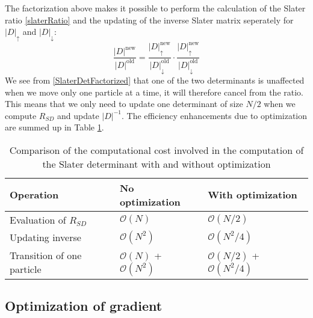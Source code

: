 \documentclass[english, a4paper]{article}
\begin{document}
\noindent The factorization above makes it possible to perform the calculation of the Slater ratio \eqref{slaterRatio}
and the updating of the inverse Slater matrix seperately for $|D|_\uparrow$ and $|D|_\downarrow$:
\begin{equation}
 \frac{|D|^{\textrm{new}}}{|D|^{\textrm{old}}} = \frac{|D|^{\textrm{new}}_\uparrow}{|D|^{\textrm{old}}_\downarrow}
 \cdot
 \frac{|D|^{\textrm{new}}_\uparrow}{|D|^{\textrm{old}}_\downarrow}
\end{equation}
We see from \eqref{SlaterDetFactorized} that one of the two determinants is unaffected
when we move only one particle at a time, it will therefore cancel from the ratio. This means
that we only need to update one determinant of size $N/2$ when we compute $R_{SD}$
and update $|D|^{-1}$. The efficiency enhancements due to optimization are summed up in Table \ref{tab:optimization}.
\begin{table}[H] 
  \begin{center}
    \begin{tabular*}{14cm}{@{\extracolsep{\fill}} lll}
      \toprule
      Operation & No optimization & With optimization  \\ 
      \hline
      Evaluation of $R_{SD}$  & $\mathcal{O}(N)$ & $\mathcal{O}(N/2)$ \\
      Updating inverse  & $\mathcal{O}(N^2)$ & $\mathcal{O}(N^2/4)$ \\ 
      Transition of one particle & $\mathcal{O}(N)$ + $\mathcal{O}(N^2)$ &
                                   $\mathcal{O}(N/2)$ + $\mathcal{O}(N^2/4)$ \\ 
      \bottomrule
      \end{tabular*} 
    \end{center}
      \caption {Comparison of the computational cost involved in the computation of the
                Slater determinant with and without optimization} 
  \label{tab:optimization} 
\end{table}

\subsection{Optimization of gradient}
\end{document}
